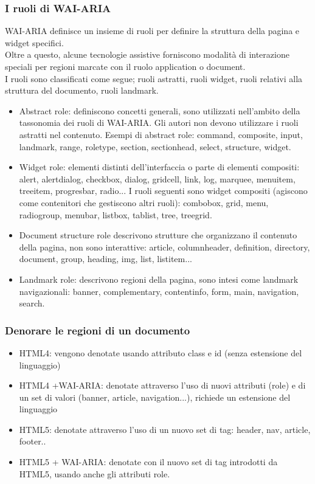 \documentclass{article}
\begin{document}
\subsubsection{I ruoli di WAI-ARIA}
WAI-ARIA definisce un insieme di ruoli per definire la struttura della pagina e widget specifici.\\
Oltre a questo, alcune tecnologie assistive forniscono modalità di interazione speciali per regioni marcate con il ruolo application o document.\\
I ruoli sono classificati come segue; ruoli astratti, ruoli widget, ruoli relativi alla struttura del documento, ruoli landmark.
\begin{itemize}
	\item Abstract role: definiscono concetti generali, sono utilizzati nell'ambito della tassonomia dei ruoli di WAI-ARIA. Gli autori non devono utilizzare i ruoli astratti nel contenuto. Esempi di abstract role: command, composite, input, landmark, range, roletype, section, sectionhead, select, structure, widget.
	\item Widget role: elementi distinti dell'interfaccia o parte di elementi compositi: alert, alertdialog, checkbox, dialog, gridcell, link, log, marquee, menuitem, treeitem, progresbar, radio...
	I ruoli seguenti sono widget compositi (agiscono come contenitori che gestiscono altri ruoli): combobox, grid, menu, radiogroup, menubar, listbox, tablist, tree, treegrid.
	\item Document structure role descrivono strutture che organizzano il contenuto della pagina, non sono interattive: article, columnheader, definition, directory, document, group, heading, img, list, listitem...
	\item Landmark role: descrivono regioni della pagina, sono intesi come landmark navigazionali: banner, complementary, contentinfo, form, main, navigation, search.
\end{itemize}
\subsubsection{Denorare le regioni di un documento}
\begin{itemize}
	\item HTML4: vengono denotate usando attributo class e id (senza estensione del linguaggio)
	\item HTML4 +WAI-ARIA: denotate attraverso l'uso di nuovi attributi (role) e di un set di valori (banner, article, navigation...), richiede un estensione del linguaggio
	\item HTML5: denotate attraverso l'uso di un nuovo set di tag: header, nav, article, footer.. 
	\item HTML5 + WAI-ARIA: denotate con il nuovo set di tag introdotti da HTML5, usando anche gli attributi role.
\end{itemize}
\end{document}
